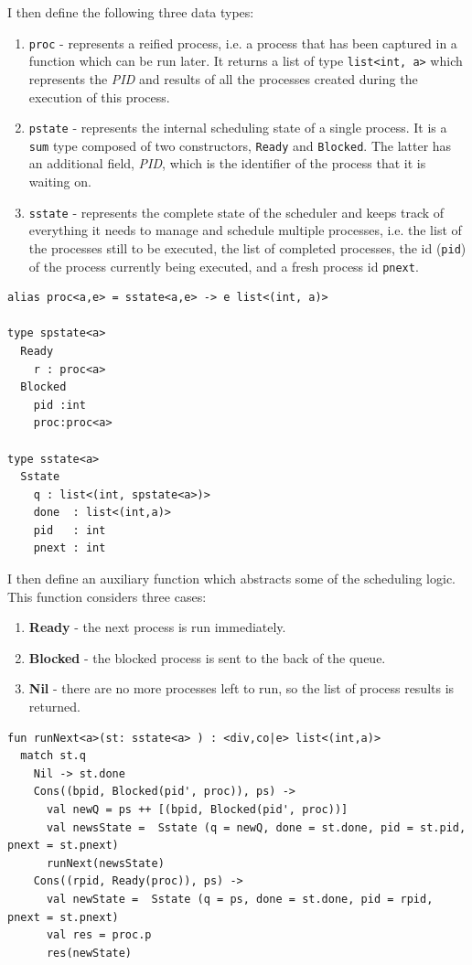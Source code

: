 \documentclass[logo,bsc,singlespacing,parskip]{infthesis}
\begin{document}
I then define the following three data types: 

\begin{enumerate}
    \item \lstinline{proc} - represents a reified process, i.e. a process that has been captured in a function which can be run later. It returns a list of type \lstinline{list<int, a>} which represents the \textit{PID} and results of all the processes created during the execution of this process.  

    \item \lstinline{pstate} - represents the internal scheduling state of a single process. It is a \lstinline{sum} type composed of two constructors, \lstinline{Ready} and \lstinline{Blocked}. The latter has an additional field, \textit{PID}, which is the identifier of the process that it is waiting on. 

    \item \lstinline{sstate} - represents the complete state of the scheduler and keeps track of everything it needs to manage and schedule multiple processes, i.e. the list of the processes still to be executed, the list of completed processes, the id (\lstinline{pid}) of the process currently being executed,  and a fresh process id \lstinline{pnext}.

\end{enumerate}


\begin{lstlisting}
alias proc<a,e> = sstate<a,e> -> e list<(int, a)>

type spstate<a>
  Ready
    r : proc<a>
  Blocked 
    pid :int 
    proc:proc<a>

type sstate<a> 
  Sstate     
    q : list<(int, spstate<a>)>
    done  : list<(int,a)>
    pid   : int
    pnext : int
\end{lstlisting}


I then define an auxiliary function which abstracts some of the scheduling logic. This function considers three cases:
\begin{enumerate}
    \item \textbf{Ready} - the next process is run immediately.
    \item \textbf{Blocked} - the blocked process is sent to the back of the queue.
    \item \textbf{Nil} - there are no more processes left to run, so the list of process results is returned.
\end{enumerate}

\begin{lstlisting}
fun runNext<a>(st: sstate<a> ) : <div,co|e> list<(int,a)> 
  match st.q
    Nil -> st.done
    Cons((bpid, Blocked(pid', proc)), ps) -> 
      val newQ = ps ++ [(bpid, Blocked(pid', proc))]
      val newsState =  Sstate (q = newQ, done = st.done, pid = st.pid, pnext = st.pnext)
      runNext(newsState) 
    Cons((rpid, Ready(proc)), ps) -> 
      val newState =  Sstate (q = ps, done = st.done, pid = rpid, pnext = st.pnext)
      val res = proc.p
      res(newState)
\end{lstlisting}
\end{document}
